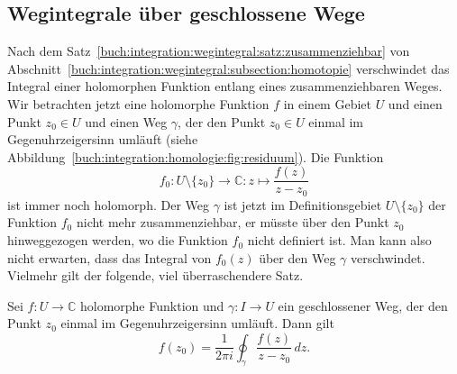 %
%
%
\subsection{Wegintegrale über geschlossene Wege}
%
Nach dem Satz~\ref{buch:integration:wegintegral:satz:zusammenziehbar}
von Abschnitt~\ref{buch:integration:wegintegral:subsection:homotopie}
verschwindet das Integral einer holomorphen Funktion entlang eines
zusammenziehbaren Weges.
Wir betrachten jetzt eine holomorphe Funktion $f$ in einem Gebiet $U$
und einen Punkt $z_0\in U$
und einen Weg $\gamma$, der den Punkt $z_0\in U$
einmal im Gegenuhrzeigersinn umläuft
(siehe Abbildung~\ref{buch:integration:homologie:fig:residuum}).
Die Funktion
\[
f_0
\colon
U\setminus\{z_0\}
\to
\mathbb{C}
:
z
\mapsto
\frac{f(z)}{z-z_0}
\]
ist immer noch holomorph.
Der Weg $\gamma$ ist jetzt im Definitionsgebiet $U\setminus \{z_0\}$
der Funktion $f_0$ nicht mehr zusammenziehbar, er müsste über den Punkt
$z_0$ hinweggezogen werden, wo die Funktion $f_0$ nicht definiert ist.
Man kann also nicht erwarten, dass das Integral von $f_0(z)$ über
den Weg $\gamma$ verschwindet.
Vielmehr gilt der folgende, viel überraschendere Satz.

\begin{satz}[Cauchy]
\label{buch:integration:satz:residuensatz}
%
%
Sei $f\colon U\to\mathbb{C}$ holomorphe Funktion und $\gamma\colon I\to U$
ein geschlossener Weg, der den Punkt $z_0$ einmal im Gegenuhrzeigersinn
umläuft.
Dann gilt
\begin{equation}
f(z_0)
=
\frac{1}{2\pi i}
\oint_{\gamma} \frac{f(z)}{z-z_0}\,dz.
\label{buch:integration:eqn:residuensatz}
\end{equation}
\end{satz}

